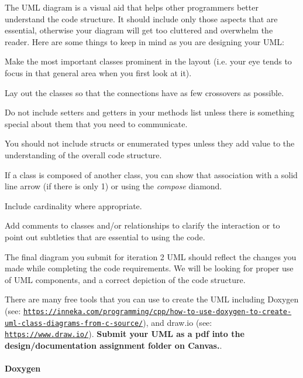 The U\+ML diagram is a visual aid that helps other programmers better understand the code structure. It should include only those aspects that are essential, otherwise your diagram will get too cluttered and overwhelm the reader. Here are some things to keep in mind as you are designing your U\+ML\+:


\begin{DoxyItemize}
\item Make the most important classes prominent in the layout (i.\+e. your eye tends to focus in that general area when you first look at it).
\item Lay out the classes so that the connections have as few crossovers as possible.
\item Do not include setters and getters in your methods list unless there is something special about them that you need to communicate.
\item You should not include structs or enumerated types unless they add value to the understanding of the overall code structure.
\item If a class is composed of another class, you can show that association with a solid line arrow (if there is only 1) or using the {\itshape compose} diamond.
\item Include cardinality where appropriate.
\item Add comments to classes and/or relationships to clarify the interaction or to point out subtleties that are essential to using the code.
\end{DoxyItemize}

The final diagram you submit for iteration 2 U\+ML should reflect the changes you made while completing the code requirements. We will be looking for proper use of U\+ML components, and a correct depiction of the code structure.

There are many free tools that you can use to create the U\+ML including Doxygen (see\+: \href{https://inneka.com/programming/cpp/how-to-use-doxygen-to-create-uml-class-diagrams-from-c-source/}{\tt https\+://inneka.\+com/programming/cpp/how-\/to-\/use-\/doxygen-\/to-\/create-\/uml-\/class-\/diagrams-\/from-\/c-\/source/}), and draw.\+io (see\+: \href{https://www.draw.io/}{\tt https\+://www.\+draw.\+io/}). {\bfseries Submit your U\+ML as a pdf into the design/documentation assignment folder on Canvas.}.

\paragraph*{Doxygen}

